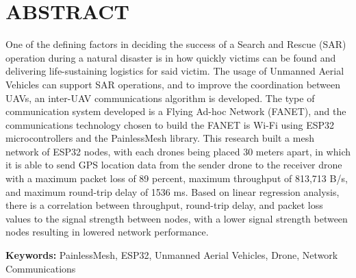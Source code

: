 \chapter*{ABSTRACT}

One of the defining factors in deciding the success of a Search and Rescue (SAR) operation during a natural disaster is in how quickly victims can be found and delivering life-sustaining logistics for said victim. The usage of Unmanned Aerial Vehicles can support SAR operations, and to improve the coordination between UAVs, an inter-UAV communications algorithm is developed. The type of communication system developed is a Flying Ad-hoc Network (FANET), and the communications technology chosen to build the FANET is Wi-Fi using ESP32 microcontrollers and the PainlessMesh library. This research built a mesh network of ESP32 nodes, with each drones being placed 30 meters apart, in which it is able to send GPS location data from the sender drone to the receiver drone with a maximum packet loss of 89 percent, maximum throughput of 813,713 B/s, and maximum round-trip delay of 1536 ms. Based on linear regression analysis, there is a correlation between throughput, round-trip delay, and packet loss values to the signal strength between nodes, with a lower signal strength between nodes resulting in lowered network performance.

\vspace{2em}
\noindent \textbf{Keywords:} PainlessMesh, ESP32, Unmanned Aerial Vehicles, Drone, Network Communications